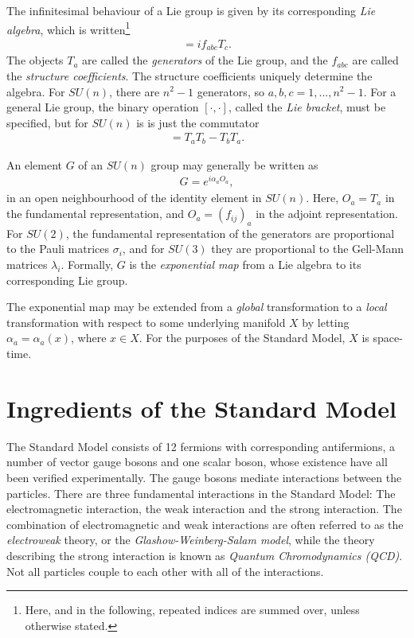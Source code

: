 \documentclass[twoside,english]{uiofysmaster}
\begin{document}
The infinitesimal behaviour of a Lie group is given by its corresponding {\it Lie algebra}, which is written\footnote{Here, and in the following, repeated indices are summed over, unless otherwise stated.} 
\begin{align}
	[T_a, T_b] = i f_{abc}T_c.
\end{align}
The objects $T_a$ are called the {\it generators} of the Lie group, and the $f_{abc}$ are called the {\it structure coefficients}. The structure coefficients uniquely determine the algebra. For $SU(n)$, there are $n^2 - 1$ generators, so $a,b,c =1,...,n^2-1$. For a general Lie group, the binary operation $[\cdot , \cdot ]$, called the {\it Lie bracket}, must be specified, but for $SU(n)$ is is just the commutator
\begin{align}
	[T_a, T_b] = T_aT_b - T_bT_a.
\end{align}

An element $G$ of an $SU(n)$ group may generally be written as
\begin{align}
	G = e^{i\alpha_a O_a},\label{eq:global_gauge_transformation}
\end{align}
in an open neighbourhood of the identity element in $SU(n)$. Here, $O_a = T_a$ in the fundamental representation, and $O_a = (f_{ij})_{a}$ in the adjoint representation. For $SU(2)$, the fundamental representation of the generators are proportional to the Pauli matrices $\sigma_i$, and for $SU(3)$ they are proportional to the Gell-Mann matrices $\lambda_i$. Formally, $G$ is the {\it exponential map} from a Lie algebra to its corresponding Lie group. 

The exponential map may be extended from a {\it global} transformation to a {\it local} transformation with respect to some underlying manifold $X$ by letting $\alpha_a = \alpha_a(x)$, where $x\in X$. For the purposes of the Standard Model, $X$ is space-time.




\section{Ingredients of the Standard Model}

The Standard Model consists of 12 fermions with corresponding antifermions, a number of vector gauge bosons and one scalar boson, whose existence have all been verified experimentally. The gauge bosons mediate interactions between the particles. There are three fundamental interactions in the Standard Model: The electromagnetic interaction, the weak interaction and the strong interaction. The combination of electromagnetic and weak interactions are often referred to as the {\it electroweak} theory, or the {\it Glashow-Weinberg-Salam model}, while the theory describing the strong interaction is known as {\it Quantum Chromodynamics (QCD)}. Not all particles couple to each other with all of the interactions. 
\end{document}
